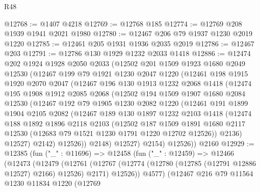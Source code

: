 \begin{lexlean}{R48}
\begin{coremodule}
@12768 := @1407 @4218
@12769 := @12768 @185
@12774 := @12769 @208 @1939 @1941 @2021 @1980
@12780 := @12467 @206 @79 @1937 @1230 @2019 @1220
@12785 := @12461 @205 @1931 @1936 @2035 @2019
@12786 := @12467 @203
@12791 := @12786 @130 @1929 @1232 @2033 @1418
@12886 := @12474
    @202
    @1924
    @1928
    @2050
    @2033
    (@12502
      @201
      @1509
      @1923
      @1680
      @2049
      @12530
      (@12467
        @199
        @79
        @1921
        @1230
        @2047
        @1220
        (@12461
          @198
          @1915
          @1920
          @2070
          @2047
          (@12467
            @196
            @130
            @1913
            @1232
            @2068
            @1418
            (@12474
              @195
              @1908
              @1912
              @2085
              @2068
              (@12502
                @194
                @1509
                @1907
                @1680
                @2084
                @12530
                (@12467
                  @192
                  @79
                  @1905
                  @1230
                  @2082
                  @1220
                  (@12461
                    @191
                    @1899
                    @1904
                    @2105
                    @2082
                    (@12467
                      @189
                      @130
                      @1897
                      @1232
                      @2103
                      @1418
                      (@12474
                        @188
                        @1892
                        @1896
                        @2118
                        @2103
                        (@12502
                          @187
                          @1509
                          @1891
                          @1680
                          @2117
                          @12530
                          (@12683 @79 @1521 @1230 @1791 @1220 @12702 @12526))
                        @2136)
                      @12527)
                    @2142)
                  @12526))
              @2148)
            @12527)
          @2154)
        @12526))
    @2160
@12929 := @12385
    (fun ("_" : @11696) =>
    @12458
      (fun ("_" : @12459) =>
      @12466
        (@12473
          (@12479
            (@12761
              (@12767 (@12774 (@12780 (@12785 (@12791 @12886 @12527) @2166) @12526) @2171) @12526))
            @4577)
          (@12467
            @216
            @79
            @11564
            @1230
            @11834
            @1220
            (@12769

\end{coremodule}
\end{lexlean}
